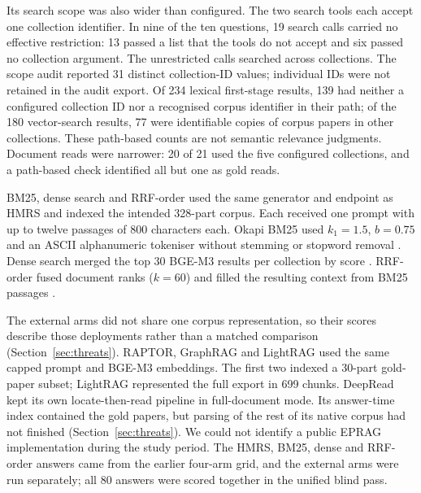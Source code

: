 Its search scope was also wider than configured. The two search tools each
accept one collection identifier. In nine of the ten questions, 19 search
calls carried no effective restriction: 13 passed a list that the tools do
not accept and six passed no collection argument. The unrestricted calls
searched across collections. The scope audit reported 31 distinct
collection-ID values; individual IDs were not retained in the audit export.
Of 234 lexical first-stage results, 139 had neither a
configured collection ID nor a recognised corpus identifier in their path;
of the 180 vector-search results, 77 were identifiable copies of corpus papers in
other collections. These path-based counts are not semantic relevance
judgments. Document reads were narrower: 20 of 21 used the five configured
collections, and a path-based check identified all but one as gold reads.

BM25, dense search and RRF-order used the same generator and endpoint as
HMRS and indexed the intended 328-part corpus. Each received one prompt with up to twelve passages of 800
characters each. Okapi BM25 used $k_1=1.5$, $b=0.75$ and an ASCII
alphanumeric tokeniser without stemming or stopword removal \citep{bm25}.
Dense search merged the top 30 BGE-M3 results per collection by score
\citep{bge-m3}. RRF-order fused document ranks ($k=60$) and filled the
resulting context from BM25 passages \citep{rrf-cormack}.

The external arms did not share one corpus representation, so their scores
describe those deployments rather than a matched comparison
(Section~\ref{sec:threats}). RAPTOR, GraphRAG and LightRAG used the same
capped prompt and BGE-M3 embeddings. The first two indexed a 30-part gold-paper subset; LightRAG
represented the full export in 699 chunks. DeepRead kept its own
locate-then-read pipeline in full-document mode. Its answer-time index
contained the gold papers, but parsing of the rest of its native corpus had
not finished (Section~\ref{sec:threats}). We could not identify a public
EPRAG implementation during the study period. The HMRS, BM25, dense and
RRF-order answers came from the earlier four-arm grid, and the external arms
were run separately; all 80 answers were scored together in the unified
blind pass.

